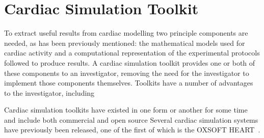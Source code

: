 \section{Cardiac Simulation Toolkit}

To extract useful results from cardiac modelling two principle components are
needed, as has been previously mentioned: the mathematical models used for
cardiac activity and a computational representation of the experimental
protocols followed to produce results.  A cardiac simulation toolkit provides
one or both of these components to an investigator, removing the need for the
investigator to implement those components themselves.  Toolkits have a number
of advantages to the investigator, including

Cardiac simulation toolkits have existed in one form or another for some
time and include both commercial and open source 
Several cardiac simulation systems have previously been released, one of
the first of which is the OXSOFT HEART~\cite{Noble-1999}.

